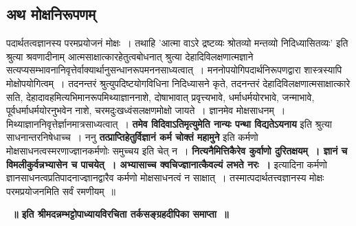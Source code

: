 \subsection*{अथ मोक्षनिरूपणम्}
	पदार्थतत्वज्ञानस्य परमप्रयोजनं मोक्षः~। तथाहि ’आत्मा वाऽरे द्रष्टव्यः श्रोतव्यो मन्तव्यो निदिध्यासितव्यः’ इति श्रुत्या श्रवणादीनाम् आत्मसाक्षात्कारहेतुत्वबोधनात् श्रुत्या देहादिविलक्षणात्मज्ञाने सत्यप्यसम्भावनानिवृत्तेर्वाक्यार्थानुसन्धानरूपमननसाध्यत्वात्~। मननोपयोगिपदार्थनिरूपणद्वारा शास्त्रस्यापि मोक्षोपयोगित्वम्~। तदनन्तरं श्रुत्युपदिष्टयोगविधिना निदिध्यासने कृते, तदनन्तरं देहादिविलक्षणात्मसाक्षात्कारे सति, देहादावहमित्यभिमानरूपमिथ्याज्ञाननाशे, दोषाभावात् प्रवृत्त्यभावे, धर्माधर्मयोरभावे, जन्माभावे, पूर्वधर्माधर्मयोरनुभवेन नाशे, चरमदुःखध्वंसलक्षणमोक्षो जायते~। ज्ञानमेव मोक्षसाधनम्~। मिथ्याज्ञाननिवृत्तेर्ज्ञानमात्रसाध्यत्वात्~। {\bfseries तमेव विदिवाऽतिमृत्युमेति नान्यः पन्था विद्यतेऽयनाय} इति श्रुत्या साधनान्तरनिषेधाच्च~। ननु {\bfseries तत्प्राप्तिहेतुर्विज्ञानं कर्म चोक्तं महामुने} इति कर्मणो मोक्षसाधनत्वस्मरणाज्ज्ञानकर्मणोः समुच्चय इति चेत् न~। {\bfseries नित्यनैमित्तिकैरेव कुर्वाणो दुरितक्षयम्~। ज्ञानं च विमलीकुर्वन्नभ्यासेन च पाचयेत्~। अभ्यासाच्च क्वचिज्ज्ञानात्कैवल्यं लभते नरः~।} इत्यादिना कर्मणो ज्ञानसाधनत्वप्रतिपादनाज्ज्ञानद्वारैव कर्मणो मोक्षसाधनत्वं न साक्षात्~। तस्मात्पदार्थतत्त्वज्ञानस्य मोक्षः परमप्रयोजनमिति सर्वं रमणीयम्~॥
\begin{center}
{\bfseries~॥ इति श्रीमदन्नम्भट्टोपाध्यायविरचिता तर्कसङ्ग्रहदीपिका समाप्ता~॥}\\[10pt]
\end{center}
